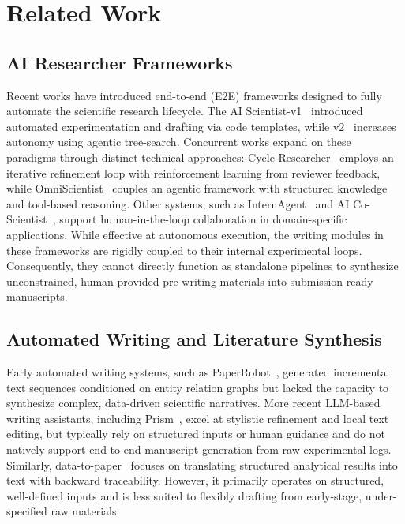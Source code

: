 \section{Related Work}
\subsection{AI Researcher Frameworks}

Recent works have introduced end-to-end (E2E) frameworks designed to fully automate the scientific research lifecycle. The AI Scientist-v1~\citep{lu2024aiscientist} introduced automated experimentation and drafting via code templates, while v2~\citep{yamada2025aiscientistv2} increases autonomy using agentic tree-search. Concurrent works expand on these paradigms through distinct technical approaches: Cycle Researcher~\citep{weng2024cycleresearcher} employs an iterative refinement loop with reinforcement learning from reviewer feedback, while OmniScientist~\citep{shao2025omniscientist} couples an agentic framework with structured knowledge and tool-based reasoning. Other systems, such as InternAgent~\citep{team2025internagent} and AI Co-Scientist~\citep{gottweis2025towards}, support human-in-the-loop collaboration in domain-specific applications. While effective at autonomous execution, the writing modules in these frameworks are rigidly coupled to their internal experimental loops. Consequently, they cannot directly function as standalone pipelines to synthesize unconstrained, human-provided pre-writing materials into submission-ready manuscripts.



\subsection{Automated Writing and Literature Synthesis}
Early automated writing systems, such as PaperRobot~\citep{wang2019paperrobot}, generated incremental text sequences conditioned on entity relation graphs but lacked the capacity to synthesize complex, data-driven scientific narratives. More recent LLM-based writing assistants, including Prism~\citep{openai_prism_2026}, excel at stylistic refinement and local text editing, but typically rely on structured inputs or human guidance and do not natively support end-to-end manuscript generation from raw experimental logs. Similarly, data-to-paper~\citep{technion2024datatopaper} focuses on translating structured analytical results into text with backward traceability. However, it primarily operates on structured, well-defined inputs and is less suited to flexibly drafting from early-stage, under-specified raw materials.

